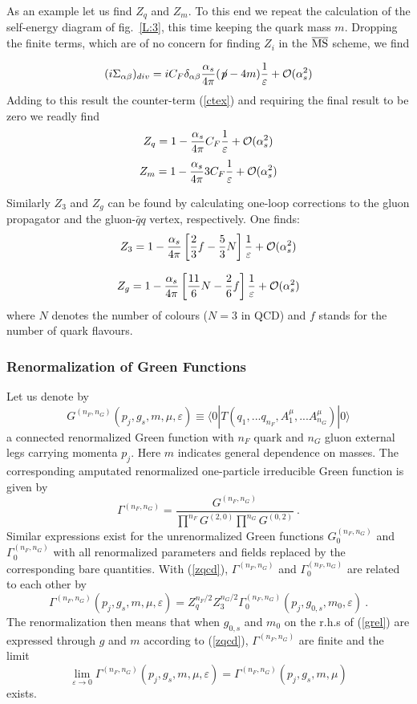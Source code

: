 \documentclass[12pt]{article}
\def\eps{\varepsilon}
\newcommand{\be}{\begin{equation}}
\newcommand{\ee}{\end{equation}}
\begin{document}
\begin{itemize}
As an example let us find $Z_q$ and $Z_m$. To this end we repeat the
calculation of the self-energy diagram of fig.~\ref{L:3}, this time keeping
the quark mass $m$. Dropping the finite terms, which are of no concern
for finding $Z_i$ in the $\overline{\rm MS}$ scheme, we find

\begin{equation}\label{sigma}
(i \Sigma_{\alpha\beta})_{div}=i C_F \delta_{\alpha\beta}  
\frac{\alpha_s}{4\pi}( \not\! p-4 m)
 \frac{1}{\varepsilon}+{\cal O}(\alpha_s^2) 
\end{equation}
Adding to this result the counter-term (\ref{ctex}) and requiring
the final result to be zero we readly find
\begin{equation}\label{zq0}
Z_q=1- \frac{\alpha_s}{4\pi} C_F \frac{1}{\varepsilon}+ {\cal O}(\alpha_s^2) 
\ee
\be\label{zm}
Z_m=1- \frac{\alpha_s}{4\pi} 3 C_F \frac{1}{\varepsilon}+{\cal O}(\alpha_s^2) 
\end{equation}

Similarly $Z_3$ and $Z_g$ can be found by calculating one-loop corrections
to the gluon propagator and the gluon-$\bar q q$ vertex, respectively.
One finds:
\begin{equation}
Z_3=1- \frac{\alpha_s}{4\pi}\left[\frac{2}{3}f-\frac{5}{3}N \right]
 \frac{1}{\varepsilon}+ {\cal O}(\alpha_s^2) 
\end{equation}

\begin{equation}\label{zg}
Z_g=1- \frac{\alpha_s}{4\pi}\left[\frac{11}{6}N-\frac{2}{6}f \right]
 \frac{1}{\varepsilon}+ {\cal O}(\alpha_s^2) 
\end{equation}
where $N$ denotes the number of colours ($N=3$ in QCD) and $f$ stands
for the number of quark flavours.
\subsubsection{Renormalization of Green Functions}
Let us denote by
\be\label{cgreen}
G^{(n_F,n_G)}(p_j,g_s,m,\mu,\eps)\equiv
\langle 0|T(q_1,...q_{n_F},A^\mu_1,...A^\mu_{n_G})|0\rangle
\ee
a connected renormalized Green function with $n_F$ quark and
$n_G$ gluon external legs carrying momenta $p_j$. Here $m$
indicates general dependence on masses. The corresponding
amputated renormalized one-particle irreducible Green function is 
given by
\be\label{ampgreen}
\Gamma^{(n_F,n_G)}=\frac{G^{(n_F,n_G)}}
{\prod^{n_F}G^{(2,0)}\prod^{n_G}G^{(0,2)}}~.
\ee
Similar expressions exist for the unrenormalized Green functions
$G_0^{(n_F,n_G)}$ and $\Gamma_0^{(n_F,n_G)}$ with all renormalized 
parameters and fields replaced by the corresponding bare quantities.
With (\ref{zqcd}),  $\Gamma^{(n_F,n_G)}$ and  
$\Gamma_0^{(n_F,n_G)}$ are related to each other by
\be\label{grel}
\Gamma^{(n_F,n_G)}(p_j,g_s,m,\mu,\eps)=Z_q^{n_F/2}Z_3^{n_G/2}
\Gamma_0^{(n_F,n_G)}(p_j,g_{0,s},m_0,\eps)~.
\ee
The renormalization then means that when $g_{0,s}$ and $m_0$ on the
r.h.s of (\ref{grel}) are expressed through $g$ and $m$ according to
(\ref{zqcd}), $\Gamma^{(n_F,n_G)}$ are finite and the limit
\be
\lim_{\eps\to 0} \Gamma^{(n_F,n_G)}(p_j,g_s,m,\mu,\eps)=
\Gamma^{(n_F,n_G)}(p_j,g_s,m,\mu)
\ee
exists.


\end{itemize}
\end{document}
